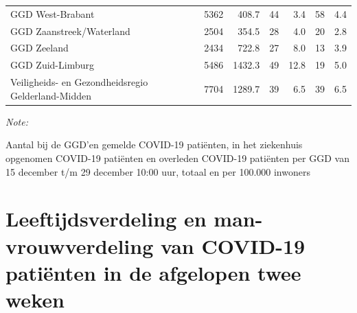 \documentclass[
  english,
  man,floatsintext]{apa6}
\begin{document}
\begin{table}[H]
\begin{threeparttable}
\begin{tabular}{lrrrrrr}
GGD West-Brabant & 5362 & 408.7 & 44 & 3.4 & 58 & 4.4\\
GGD Zaanstreek/Waterland & 2504 & 354.5 & 28 & 4.0 & 20 & 2.8\\
GGD Zeeland & 2434 & 722.8 & 27 & 8.0 & 13 & 3.9\\
GGD Zuid-Limburg & 5486 & 1432.3 & 49 & 12.8 & 19 & 5.0\\
Veiligheids- en Gezondheidsregio Gelderland-Midden & 7704 & 1289.7 & 39 & 6.5 & 39 & 6.5\\
\bottomrule
\end{tabular}
\begin{tablenotes}
\item \textit{Note: } 
\item Aantal bij de GGD’en gemelde COVID-19 patiënten, in het ziekenhuis opgenomen COVID-19 patiënten en overleden COVID-19 patiënten per GGD van 15 december t/m 29 december 10:00 uur, totaal en per 100.000 inwoners
\end{tablenotes}
\end{threeparttable}
\endgroup{}
\end{table}

\newpage

\hypertarget{leeftijdsverdeling-en-man-vrouwverdeling-van-covid-19-patiuxebnten-in-de-afgelopen-twee-weken}{%
\section{Leeftijdsverdeling en man-vrouwverdeling van COVID-19 patiënten in de afgelopen twee weken}\label{leeftijdsverdeling-en-man-vrouwverdeling-van-covid-19-patiuxebnten-in-de-afgelopen-twee-weken}}
\end{document}
